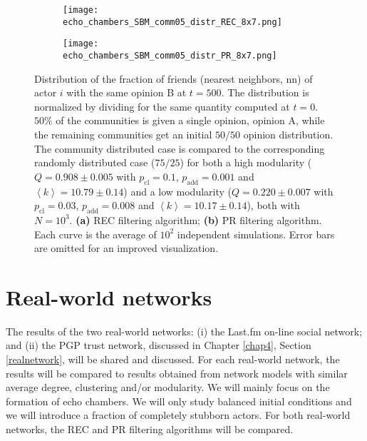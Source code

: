 \documentclass[11 pt , letterpaper , twoside , openright]{book}
\begin{document}
\begin{figure}[H]
  \begin{subfigure}[b]{0.49\textwidth}
    \caption{}
  	\texttt{[image: echo\_chambers\_SBM\_comm05\_distr\_REC\_8x7.png]}
    \label{rec_comm05_echo}
  \end{subfigure}
  \begin{subfigure}[b]{0.49\textwidth}
    \caption{}
  	\texttt{[image: echo\_chambers\_SBM\_comm05\_distr\_PR\_8x7.png]}
    \label{pr_comm05_echo}
  \end{subfigure}
  \captionsetup{format=plain}
  \caption[Distribution of the fraction of friends (nearest neighbors, nn) of actor $i$ with the same opinion B at $t = 500$. $50 \%$ of the communities is given a single opinion, opinion A, while the remaining communities get an initial $50/50$ opinion distribution. The community distributed case is compared to the corresponding randomly distributed case ($75/25$) for both a high modularity and a low modularity network. Results for the REC and PR filtering algorithms.]{Distribution of the fraction of friends (nearest neighbors, nn) of actor $i$ with the same opinion B at $t = 500$. The distribution is normalized by dividing for the same quantity computed at $t=0$. $50 \%$ of the communities is given a single opinion, opinion A, while the remaining communities get an initial $50/50$ opinion distribution. The community distributed case is compared to the corresponding randomly distributed case ($75/25$) for both a high modularity ($Q = 0.908 \pm 0.005$ with $p_{\text{cl}} = 0.1$, $p_{\text{add}} = 0.001$ and $\left<k\right> = 10.79 \pm 0.14$) and a low modularity ($Q = 0.220 \pm 0.007$ with $p_{\text{cl}} = 0.03$, $p_{\text{add}} = 0.008$ and $\left<k\right> = 10.17 \pm 0.14$), both with $N=10^3$. \textbf{(a)} REC filtering algorithm; \textbf{(b)} PR filtering algorithm. Each curve is the average of $10^2$ independent simulations. Error bars are omitted for an improved visualization.}
\label{echo_05_commOp0_other_50-50}
\end{figure}

\newpage
\section{Real-world networks}

The results of the two real-world networks: (i) the Last.fm on-line social network; and (ii) the PGP trust network, discussed in Chapter \ref{chap4}, Section \ref{realnetwork}, will be shared and discussed. For each real-world network, the results will be compared to results obtained from network models with similar average degree, clustering and/or modularity. We will mainly focus on the formation of echo chambers. We will only study balanced initial conditions and we will introduce a fraction of completely stubborn actors. For both real-world networks, the REC and PR filtering algorithms will be compared.
\end{document}
